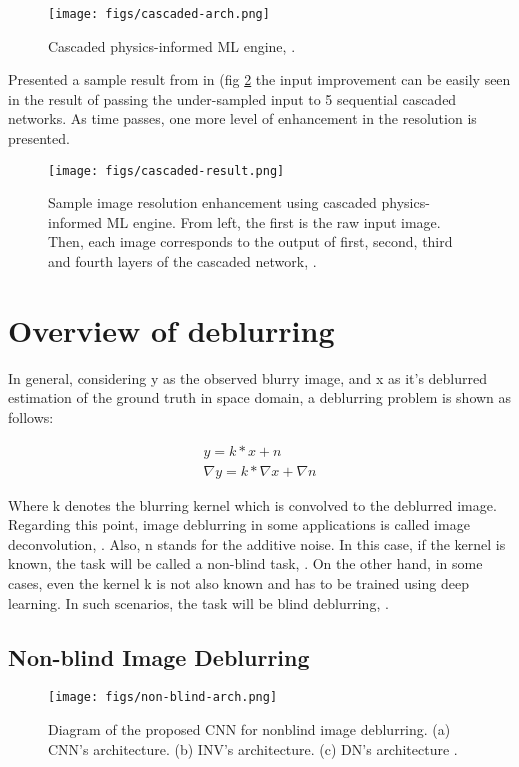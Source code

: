 \documentclass[conference, 11pt]{IEEEtran}
\begin{document}
	
	\begin{figure}[!htbp]
		\texttt{[image: figs/cascaded-arch.png]}
		\centering
		\caption{Cascaded physics-informed ML engine, \cite{Ozcan2019}.}
		\label{img:cascaded-arch}
	\end{figure}
	
	Presented a sample result from in (fig \ref{img:cascaded-result} the input improvement can be easily seen in the result of passing the under-sampled input to 5 sequential cascaded networks. As time passes, one more level of enhancement in the resolution is presented.
	
	\begin{figure}[!htbp]
		\texttt{[image: figs/cascaded-result.png]}
		\centering
		\caption{Sample image resolution enhancement using cascaded physics-informed ML engine. From left, the first is the raw input image. Then, each image corresponds to the output of first, second, third and fourth layers of the cascaded network, \cite{Ozcan2019}.}
		\label{img:cascaded-result}
	\end{figure}
	\pagebreak
	\section{Overview of deblurring}
	In general, considering y as the observed blurry image, and x as it's deblurred estimation of the ground truth in space domain, a deblurring problem is shown as follows:
	
	\begin{align}
		y = k * x + n \\
		\nabla{y} = k *\nabla{x} + \nabla{n}
	\end{align}
	
	Where k denotes the blurring kernel which is convolved to the deblurred image. Regarding this point, image deblurring in some applications is called image deconvolution, \cite{Quan2021}. Also, n stands for the additive noise. In this case, if the kernel is known, the task will be called a non-blind task, \cite{Quan2021}. On the other hand, in some cases, even the kernel k is not also known and has to be trained using deep learning. In such scenarios, the task will be blind deblurring, \cite{Li2020}.
	
	\subsection{Non-blind Image Deblurring}
	
	\begin{figure}[!htbp]
		\texttt{[image: figs/non-blind-arch.png]}
		\centering
		\caption{Diagram of the proposed CNN for nonblind image deblurring. (a) CNN’s architecture. (b) INV’s architecture. (c) DN’s architecture \cite{Quan2021}.}
		\label{img:nonblind-arch}
	\end{figure}
	
\end{document}
